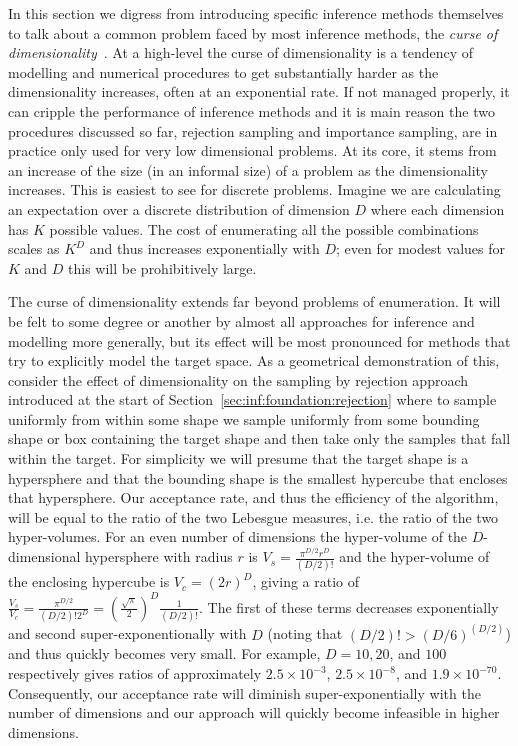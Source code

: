 
In this section we digress from introducing specific inference methods themselves
to talk about a common problem faced by most inference methods, the
\emph{curse of dimensionality}~\citep{bellman1961adaptive}.  At a high-level the curse of 
dimensionality is a tendency
of modelling and numerical procedures to get substantially harder as the dimensionality increases, 
often at an exponential rate.  If not managed properly, it can cripple the performance of
inference methods and it is main reason the two procedures discussed so far, rejection
sampling and importance sampling, are in practice only used for very low dimensional problems.
At its core, it stems from an increase of the size (in an informal size) of a problem as the
dimensionality increases.  This is easiest to see for discrete problems.   Imagine we are calculating
an expectation over a discrete distribution of dimension $D$ where each dimension has $K$
possible values.  The cost of enumerating all the possible combinations scales as $K^D$ and thus
increases exponentially with $D$; even for modest values for $K$ and $D$ this will 
be prohibitively large.

The curse of dimensionality extends far beyond problems of enumeration.  It will be felt to
some degree or another by almost all approaches for inference and modelling more generally,
but its effect will be most pronounced for methods that try to explicitly model the target
space.  As a geometrical demonstration of this, consider the effect of dimensionality on 
the sampling by rejection approach introduced at the start of Section~\ref{sec:inf:foundation:rejection} where to
sample uniformly from within some shape we sample uniformly from
some bounding shape or box containing the target shape and then take only the samples
that fall within the target.  For simplicity we will presume that the target shape is a hypersphere and that
the bounding shape is the smallest hypercube that encloses that hypersphere.  Our acceptance rate,
and thus the efficiency of the algorithm, will be equal to the ratio of the two Lebesgue 
measures, i.e. the ratio of the two hyper-volumes.  
For an even number of dimensions
the hyper-volume of the $D$-dimensional hypersphere with radius $r$ is $V_{s} = \frac{\pi^{D/2}r^D}{(D/2)!}$
and the hyper-volume of the enclosing hypercube is $V_c = (2r)^D$, giving a ratio of
$\frac{V_s}{V_c} = \frac{\pi^{D/2}}{(D/2)! 2^D} = \left(\frac{\sqrt{\pi}}{2}\right)^D\frac{1}{(D/2)!}$.
The first of these terms decreases exponentially and second
super-exponentionally with $D$ (noting that $(D/2)!>(D/6)^{(D/2)}$) and thus quickly becomes
very small.  For example, $D=10, 20$, and $100$ respectively gives ratios of approximately
$2.5 \times 10^{-3}$, $2.5 \times 10^{-8}$, and $1.9\times 10^{-70}$.  
Consequently, our acceptance rate will diminish
super-exponentially with the number of dimensions and our approach will quickly become
infeasible in higher dimensions.

